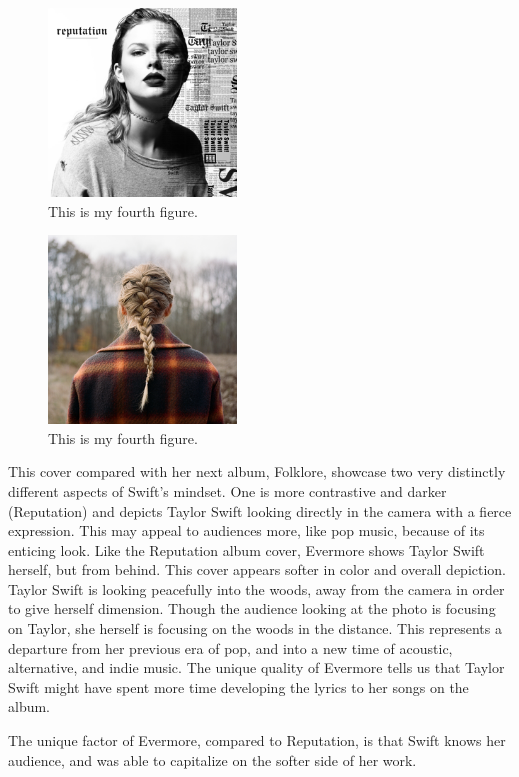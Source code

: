 \documentclass[12pt]{article}
\begin{document}
	\begin{figure}[tbp]
  \centering
  \includegraphics[width=50mm]{reputationcover}
  \caption{This is my fourth figure.}
  \label{fig:Reputation Album Cover}
\end{figure}

	\begin{figure}[tbp]
  \centering
  \includegraphics[width=50mm]{evermore}
  \caption{This is my fourth figure.}
  \label{fig:Evermore Album Cover}
\end{figure}

This cover compared with her next album, Folklore, showcase two very distinctly different aspects of Swift's mindset. One is more contrastive and darker (Reputation) and depicts Taylor Swift looking directly in the camera with a fierce expression. This may appeal to audiences more, like pop music, because of its enticing look. Like the Reputation album cover, Evermore shows Taylor Swift herself, but from behind. This cover appears softer in color and overall depiction. Taylor Swift is looking peacefully into the woods, away from the camera in order to give herself dimension. Though the audience looking at the photo is focusing on Taylor, she herself is focusing on the woods in the distance. This represents a departure from her previous era of pop, and into a new time of acoustic, alternative, and indie music. The unique quality of Evermore tells us that Taylor Swift might have spent more time developing the lyrics to her songs on the album. 

The unique factor of Evermore, compared to Reputation, is that Swift knows her audience, and was able to capitalize on the softer side of her work. 
	
\end{document}

